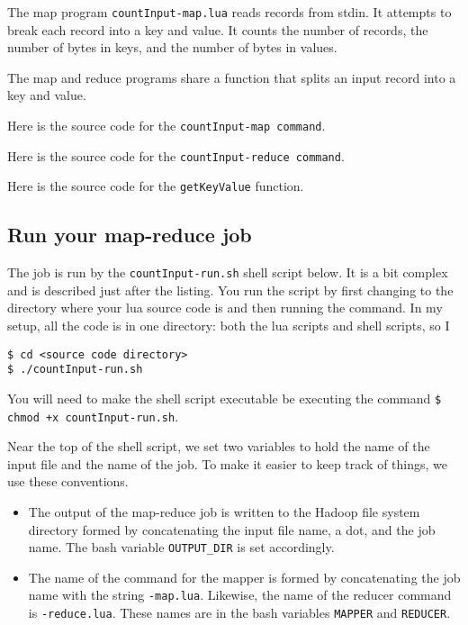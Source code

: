 \documentclass{article}
\let\code\texttt %
\begin{document}
The map program \code{countInput-map.lua} reads records from stdin. It
attempts to break each record into a key and value. It counts the number
of records, the number of bytes in keys, and the number of bytes in
values.

The map and reduce programs share a function that splits an input record
into a key and value.

Here is the source code for the \code{countInput-map command}.




Here is the source code for the \code{countInput-reduce command}.




Here is the source code for the \code{getKeyValue} function.



\subsection{Run your map-reduce job}

The job is run by the \code{countInput-run.sh} shell script below. It is
a bit complex and is described just after the listing. You run the
script by first changing to the directory where your lua source code is
and then running the command. In my setup, all the code is in one
directory: both the lua scripts and shell scripts, so I 

\begin{verbatim}
$ cd <source code directory>
$ ./countInput-run.sh
\end{verbatim}

You will need to make the shell script executable be executing the
command \code{\$ chmod +x countInput-run.sh}.



Near the top of the shell script, we set two variables to hold the name
of the input file and the name of the job. To make it easier to keep
track of things, we use these conventions.
\begin{itemize}
  \item The output of the map-reduce job is written to the Hadoop file
    system directory formed by concatenating the input file name, a dot,
    and the job name. The bash variable \code{OUTPUT\_DIR} is set
    accordingly.
  \item The name of the command for the mapper is formed by
    concatenating the job name with the string \code{-map.lua}.
    Likewise, the name of the reducer command is \code{-reduce.lua}.
    These names are in the bash variables \code{MAPPER} and
    \code{REDUCER}.
\end{itemize}
\end{document}
